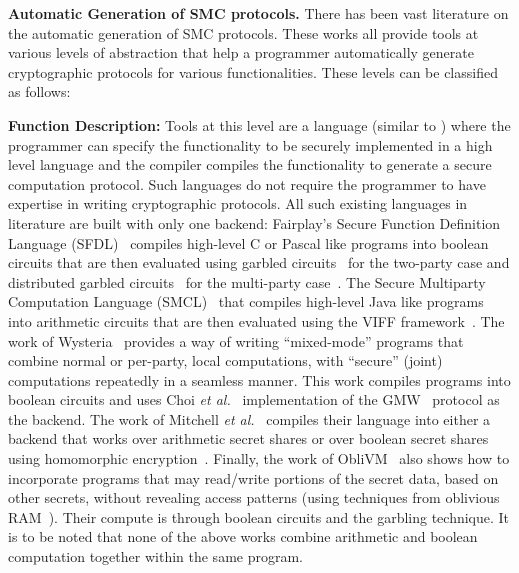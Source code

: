 \noindent\textbf{Automatic Generation of SMC protocols.}
There has been vast literature on the automatic generation of SMC protocols. These works all provide tools at various levels of abstraction that help a programmer automatically generate cryptographic protocols for various functionalities. These levels can be classified as follows: 
\begin{tiret}
\item {\bf Function Description:} Tools at this level are a language (similar to \tool) where the programmer can specify the functionality to be securely implemented in a high level language and the compiler compiles the functionality to generate a secure computation protocol. Such languages do not require the programmer to have expertise in writing cryptographic protocols. All such existing languages in literature are built with only one backend: Fairplay's Secure Function Definition Language (SFDL)~\cite{fairplay,fairplaymp} compiles high-level C or Pascal like programs into boolean circuits that are then evaluated using garbled circuits~\cite{yao} for the two-party case and distributed garbled circuits~\cite{bmr} for the multi-party case~\cite{bmr}. The Secure Multiparty Computation Language (SMCL)~\cite{smcl} that compiles high-level Java like programs into arithmetic circuits that are then evaluated using the VIFF framework~\cite{viff}. The work of Wysteria~\cite{wysteria} provides a way of writing ``mixed-mode'' programs that combine normal or per-party, local computations, with ``secure'' (joint) computations repeatedly in a seamless manner. This work compiles programs into boolean circuits and uses Choi {\em et al.}~\cite{choi} implementation of the GMW~\cite{gmw} protocol as the backend. The work of Mitchell {\em et al.}~\cite{lambdaps} compiles their language into either a backend that works over arithmetic secret shares or over boolean secret shares using homomorphic encryption~\cite{gentry}. Finally, the work of ObliVM~\cite{oblivm} also shows how to incorporate programs that may read/write portions of the secret data, based on other secrets, without revealing access patterns (using techniques from oblivious RAM~\cite{oram1,oram2}). Their compute is through boolean circuits and the garbling technique. It is to be noted that none of the above works combine arithmetic and boolean computation together within the same program. 

\end{tiret}
